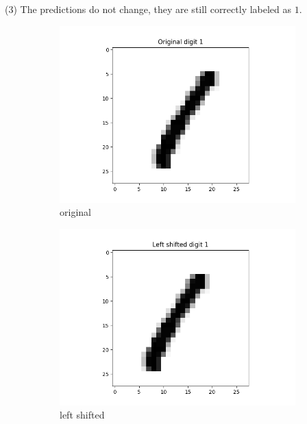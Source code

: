 \documentclass[12pt]{article}
\begin{document}
(3) The predictions do not change, they are still correctly labeled as
$1$.
\begin{figure}[h]
    \centering
    \begin{subfigure}[b]{0.32\linewidth}
    \includegraphics [width=\linewidth]{digit1_original.png}
    \caption {original}
    \end{subfigure}
    \begin{subfigure}[b]{0.32\linewidth}
    \includegraphics [width=\linewidth]{digit1_left.png}
    \caption {left shifted}
    \end{subfigure}
    \begin{subfigure}[b]{0.32\linewidth}

\end{subfigure}
\end{figure}
\end{document}
